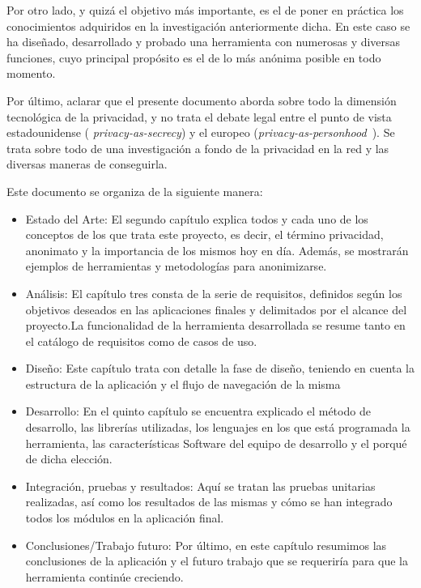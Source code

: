 Por otro lado, y quizá el objetivo más importante, es el de poner en
práctica los conocimientos adquiridos en la investigación
anteriormente dicha. En este caso se ha diseñado, desarrollado y
probado una herramienta con numerosas y diversas funciones, cuyo
principal propósito es el de  lo más
anónima posible en todo momento.

Por último, aclarar que el presente documento aborda sobre todo la dimensión tecnológica de la privacidad, y no trata el debate legal entre el punto de vista estadounidense ( \textit{privacy-as-secrecy}) y el europeo (\textit{privacy-as-personhood}~\cite{solove2002conceptualizing}). Se trata sobre todo de una investigación a fondo de la privacidad en la red y las diversas maneras de conseguirla.





Este documento se organiza de la siguiente manera:
\begin{itemize}
	\item Estado  del  Arte: El segundo capítulo explica todos y cada uno de los conceptos de los que trata este proyecto, es decir, el término privacidad, anonimato y la importancia de los mismos hoy en día. Además, se mostrarán ejemplos de herramientas y metodologías para anonimizarse. 
	\item Análisis: El capítulo tres consta de la serie de requisitos, definidos  según  los objetivos  deseados  en  las  aplicaciones  finales  y  delimitados  por  el  alcance  del proyecto.La funcionalidad de la herramienta desarrollada se resume tanto en el catálogo de requisitos como de casos de uso.
	\item Diseño: Este capítulo trata con detalle la fase de diseño, teniendo en cuenta la estructura de la aplicación y el flujo de navegación de la misma 
	\item Desarrollo: En el quinto capítulo se encuentra explicado el método de desarrollo, las librerías utilizadas, los lenguajes en los que está programada la herramienta, las características Software del equipo de desarrollo y el porqué de dicha elección.
	\item Integración, pruebas y resultados: Aquí se tratan las pruebas unitarias realizadas, así como los resultados de las mismas y cómo se han integrado todos los módulos en la aplicación final.
	\item Conclusiones/Trabajo  futuro: Por último, en este capítulo resumimos las conclusiones de la aplicación y el futuro trabajo que se requeriría para que la herramienta continúe creciendo.
\end{itemize}

\newpage \thispagestyle{empty} %